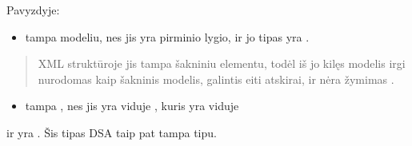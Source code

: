 \documentclass[letterpaper,10pt,lithuanian]{sphinxmanual}
\begin{document}
\sphinxAtStartPar
Pavyzdyje:
\begin{itemize}
\item {} 
\sphinxAtStartPar
{}  tampa modeliu, nes jis yra pirminio lygio, ir jo tipas yra {\hyperref[\detokenize{schemos/xsd:xsd-complextype}]{}}.

\end{itemize}
\begin{quote}

\sphinxAtStartPar
XML struktūroje jis tampa šakniniu elementu, todėl iš jo kilęs modelis irgi nurodomas kaip šakninis
modelis, galintis eiti atskirai, ir nėra žymimas .
\end{quote}
\begin{itemize}
\item {} 
\sphinxAtStartPar
{}  tampa {\hyperref[\detokenize{formatas:model}]{}}  {\hyperref[\detokenize{formatas:property}]{}}, nes jis yra viduje {\hyperref[\detokenize{schemos/xsd:xsd-complextype}]{}},
kuris yra viduje

\end{itemize}
\begin{description}
\sphinxAtStartPar
ir yra . Šis  tipas DSA taip pat tampa  tipu.

\end{description}
\end{document}
